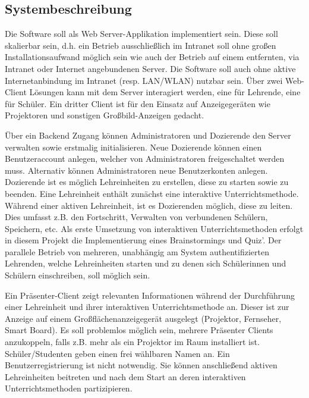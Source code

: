 \subsection{Systembeschreibung}\label{sec:sysbeschreib}
Die Software soll als Web Server-Applikation implementiert sein. Diese soll skalierbar sein, d.h. ein Betrieb ausschließlich im Intranet soll ohne großen Installationsaufwand möglich sein wie auch der Betrieb auf einem entfernten, via Intranet oder Internet angebundenen Server. Die Software soll auch ohne aktive Internetanbindung im Intranet (resp. LAN/WLAN) nutzbar sein.
Über zwei Web-Client Lösungen kann mit dem Server interagiert werden, eine für Lehrende, eine für Schüler. Ein dritter Client ist für den Einsatz auf Anzeigegeräten wie Projektoren und sonstigen Großbild-Anzeigen gedacht.  

Über ein Backend Zugang können Administratoren und Dozierende den Server verwalten sowie erstmalig initialisieren. Neue Dozierende können einen Benutzeraccount anlegen, welcher von Administratoren freigeschaltet werden muss. Alternativ können Administratoren neue Benutzerkonten anlegen. Dozierende ist es möglich Lehreinheiten zu erstellen, diese zu starten sowie zu beenden. Eine Lehreinheit enthält zunächst eine interaktive Unterrichtsmethode. Während einer aktiven Lehreinheit, ist es Dozierenden möglich, diese zu leiten. Dies umfasst z.B. den Fortschritt, Verwalten von verbundenen Schülern, Speichern, etc. Als erste Umsetzung von interaktiven Unterrichtsmethoden  erfolgt in diesem Projekt die Implementierung eines Brainstormings und Quiz'. Der parallele Betrieb von mehreren, unabhängig am System authentifizierten Lehrenden, welche Lehreinheiten starten und zu denen sich Schülerinnen und Schülern einschreiben, soll möglich sein.

Ein Präsenter-Client zeigt relevanten Informationen während der Durchführung einer Lehreinheit und ihrer interaktiven Unterrichtsmethode an. Dieser ist zur Anzeige auf einem Großflächenanzeigegerät ausgelegt (Projektor, Fernseher, Smart Board). Es soll problemlos möglich sein, mehrere Präsenter Clients anzukoppeln, falls z.B. mehr als ein Projektor im Raum installiert ist. \\ 

Schüler/Studenten geben einen frei wählbaren Namen an. Ein Benutzerregistrierung ist nicht notwendig. Sie können anschließend aktiven Lehreinheiten beitreten und nach dem Start an deren interaktiven Unterrichtsmethoden partizipieren. \\


